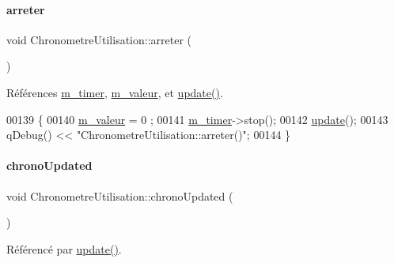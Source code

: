 \paragraph{\texorpdfstring{arreter}{arreter}}
{\footnotesize\ttfamily void Chronometre\+Utilisation\+::arreter (\begin{DoxyParamCaption}{ }\end{DoxyParamCaption})\hspace{0.3cm}{\ttfamily [slot]}}



Références \hyperlink{class_chronometre_utilisation_ae86620ca7d91c0d06c2e695493638bf2}{m\+\_\+timer}, \hyperlink{class_chronometre_utilisation_a7ef8b30ae4b6db56b9be832c847186ea}{m\+\_\+valeur}, et \hyperlink{class_chronometre_utilisation_add760c3052342baec482fe0752a89b86}{update()}.


\begin{DoxyCode}
00139 \{
00140     \hyperlink{class_chronometre_utilisation_a7ef8b30ae4b6db56b9be832c847186ea}{m\_valeur} = 0 ;
00141     \hyperlink{class_chronometre_utilisation_ae86620ca7d91c0d06c2e695493638bf2}{m\_timer}->stop();
00142     \hyperlink{class_chronometre_utilisation_add760c3052342baec482fe0752a89b86}{update}();
00143     qDebug() << \textcolor{stringliteral}{"ChronometreUtilisation::arreter()"};
00144 \}
\end{DoxyCode}
\mbox{\label{class_chronometre_utilisation_ae4e197f888e33feb23801d2edcf2c4a5}} 
\paragraph{\texorpdfstring{chrono\+Updated}{chronoUpdated}}
{\footnotesize\ttfamily void Chronometre\+Utilisation\+::chrono\+Updated (\begin{DoxyParamCaption}\item[{Q\+String}]{ }\end{DoxyParamCaption})\hspace{0.3cm}{\ttfamily [signal]}}



Référencé par \hyperlink{class_chronometre_utilisation_add760c3052342baec482fe0752a89b86}{update()}.

\mbox{\label{class_chronometre_utilisation_ac3f2fb837e9ba408d4dcaf488b289c64}} 
